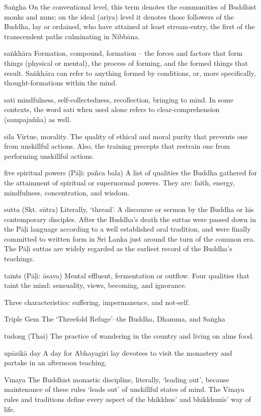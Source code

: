 Saṅgha On the conventional level, this term denotes the communities 
of Buddhist monks and nuns; on the ideal (ariya) level it denotes those 
followers of the Buddha, lay or ordained, who have attained at least 
stream-entry, the first of the transcendent paths culminating in 
Nibbāna.

saṅkhāra Formation, compound, formation – the forces and factors 
that form things (physical or mental), the process of forming, and the 
formed things that result. Saṅkhāra can refer to anything formed by 
conditions, or, more specifically, thought-formations within the mind.

sati mindfulness, self-collectedness, recollection, bringing to mind. 
In some contexts, the word sati when used alone refers to 
clear-comprehension (sampajañña) as well.

sīla Virtue, morality. The quality of ethical and moral purity that 
prevents one from unskillful actions. Also, the training precepts that 
restrain one from performing unskillful actions.

five spiritual powers (Pāḷi: pañca bala) A list of qualities the 
Buddha gathered for the attainment of spiritual or supernormal powers. 
They are: faith, energy, mindfulness, concentration, and wisdom.

sutta (Skt. sūtra) Literally, `thread'. A discourse or sermon by the 
Buddha or his contemporary disciples. After the Buddha's death the 
suttas were passed down in the Pāḷi language according to a well 
established oral tradition, and were finally committed to written form 
in Sri Lanka just around the turn of the common era. The Pāḷi suttas 
are widely regarded as the earliest record of the Buddha's teachings.

taints (Pāḷi: āsava) Mental effluent, fermentation or outflow. Four 
qualities that taint the mind: sensuality, views, becoming, and 
ignorance.

Three characteristics: suffering, impermanence, and not-self.

Triple Gem The `Threefold Refuge'–the Buddha, Dhamma, and Saṅgha

tudong (Thai) The practice of wandering in the country and living on 
alms food.

upāsikā day A day for Abhayagiri lay devotees to visit the monastery 
and partake in an afternoon teaching.

Vinaya The Buddhist monastic discipline, literally, `leading out', 
because maintenance of these rules `leads out' of unskillful states of 
mind. The Vinaya rules and traditions define every aspect of the 
bhikkhus' and bhikkhunīs' way of life.

